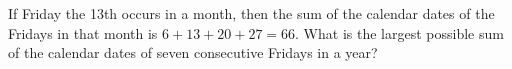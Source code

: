 If Friday the 13th occurs in a month, then the sum of the calendar dates of the Fridays in that month is $6+13+20+27=66$. What is the largest possible sum of the calendar dates of seven consecutive Fridays in a year?
